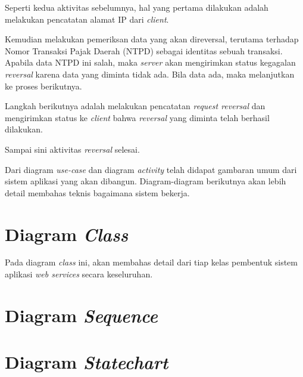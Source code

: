 Seperti kedua aktivitas sebelumnya, hal yang pertama dilakukan adalah melakukan pencatatan alamat IP dari \textit{client}.

Kemudian melakukan pemeriksan data yang akan direversal, terutama terhadap Nomor Transaksi Pajak Daerah (NTPD) sebagai identitas sebuah transaksi. Apabila data NTPD ini salah, maka \textit{server} akan mengirimkan status kegagalan \textit{reversal} karena data yang diminta tidak ada. Bila data ada, maka melanjutkan ke proses berikutnya.

Langkah berikutnya adalah melakukan pencatatan \textit{request reversal} dan mengirimkan status ke \textit{client} bahwa \textit{reversal} yang diminta telah berhasil dilakukan.

Sampai sini aktivitas \textit{reversal} selesai.

Dari diagram \textit{use-case} dan diagram \textit{activity} telah didapat gambaran umum dari sistem aplikasi yang akan dibangun. Diagram-diagram berikutnya akan lebih detail membahas teknis bagaimana sistem bekerja.

\section{Diagram \textit{Class}}

Pada diagram \textit{class} ini, akan membahas detail dari tiap kelas pembentuk sistem aplikasi \textit{web services} secara keseluruhan. 

\section{Diagram \textit{Sequence}}

\section{Diagram \textit{Statechart}}
